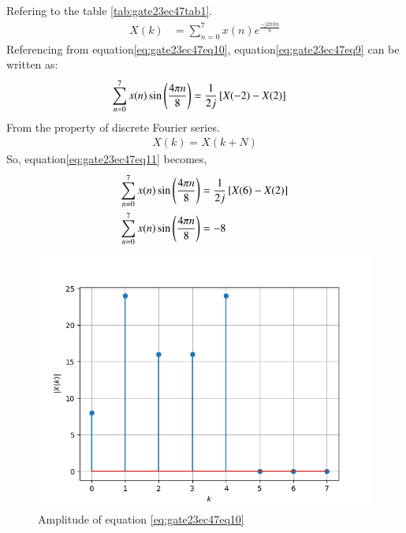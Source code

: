 \documentclass[journal,12pt,onecolumn]{IEEEtran}
\theoremstyle{remark}
\begin{document}
\begin{enumerate}
Refering to the table \ref{tab:gate23ec47tab1}.
\begin{align}
X(k)&=\sum\limits_{n=0}^{7} x(n)e^{\frac{-j2\pi kn}{8}}\label{eq:gate23ec47eq10}
\end{align}
Referencing from equation\eqref{eq:gate23ec47eq10}, equation\eqref{eq:gate23ec47eq9} can be written as:
\begin{align}
\sum\limits_{n=0}^{7}x(n) \sin\brak{\frac{4\pi n}{8}}&=\frac{1}{2j}\sbrak{X(-2)-X(2)}\label{eq:gate23ec47eq11}
\end{align}
From the property of discrete Fourier series.\\
\begin{align}
X(k)=X(k+N)
\end{align}
So, equation\eqref{eq:gate23ec47eq11} becomes,\\
\begin{align}
\sum\limits_{n=0}^{7}x(n) \sin\left(\frac{4\pi n}{8}\right)&=\frac{1}{2j}{}\left[X(6)-X(2)\right]\\
\sum\limits_{n=0}^{7}x(n) \sin\left(\frac{4\pi n}{8}\right)&=-8
\end{align}
\begin{figure}[h!]
    \centering
    \includegraphics[width=\columnwidth]{2023/EC/47/figs/mm2.png}
    \caption{Amplitude of equation \eqref{eq:gate23ec47eq10}}
    \label{fig:gate23ec47fig3}
\end{figure}
\begin{figure}[h!]
    \centering

\end{figure}
\end{enumerate}
\end{document}
